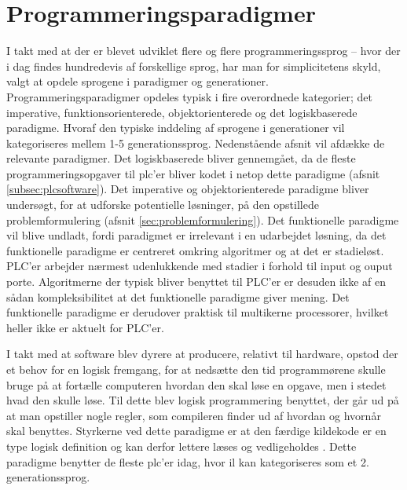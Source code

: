 \section{Programmeringsparadigmer}\label{sec:paradigmer}\label{ssec:hovedparadigmer}

I takt med at der er blevet udviklet flere og flere programmeringssprog – hvor der i dag findes hundredevis af forskellige sprog, har man for simplicitetens skyld, valgt at opdele sprogene i paradigmer og generationer. Programmeringsparadigmer opdeles typisk i fire overordnede kategorier; det imperative, funktionsorienterede, objektorienterede og det logiskbaserede paradigme. Hvoraf den typiske inddeling af sprogene i generationer vil kategoriseres mellem 1-5 generationssprog. Nedenstående afsnit vil afdække de relevante paradigmer. Det logiskbaserede bliver gennemgået, da de fleste programmeringsopgaver til \gls{plc}’er bliver kodet i netop dette paradigme (afsnit \ref{subsec:plcsoftware}). Det imperative og objektorienterede paradigme bliver undersøgt, for at udforske potentielle løsninger, på den opstillede problemformulering (afsnit \ref{sec:problemformulering}). Det funktionelle paradigme vil blive undladt, fordi paradigmet er irrelevant i en udarbejdet løsning, da det funktionelle paradigme er centreret omkring algoritmer og at det er stadieløst. PLC'er arbejder nærmest udenlukkende med stadier i forhold til input og ouput porte. Algoritmerne der typisk bliver benyttet til PLC'er er desuden ikke af en sådan kompleksibilitet at det funktionelle paradigme giver mening. Det funktionelle paradigme er derudover praktisk til multikerne processorer, hvilket heller ikke er aktuelt for PLC'er. \cite{functprog}

I takt med at software blev dyrere at producere, relativt til hardware, opstod der et behov for en logisk fremgang, for at nedsætte den tid programmørene skulle bruge på at fortælle computeren hvordan den skal løse en opgave, men i stedet hvad den skulle løse. Til dette blev logisk programmering benyttet, der går ud på at man opstiller nogle regler, som compileren finder ud af hvordan og hvornår skal benyttes. Styrkerne ved dette paradigme er at den færdige kildekode er en type logisk definition og kan derfor lettere læses og vedligeholdes \cite[kapitel 16]{Sebesta_2013}. Dette paradigme benytter de fleste \gls{plc}'er idag, hvor \gls{il} kan kategoriseres som et 2. generationssprog.

